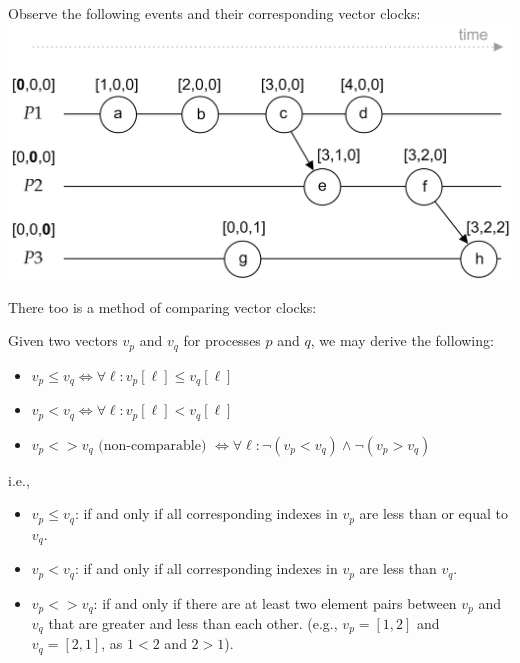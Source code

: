 \begin{Example}

    Observe the following events and their corresponding vector clocks:\\

    \hspace{4em}
    \includegraphics[width=.7\textwidth]{./Sections/time/vector.png}

    \vspace{1em}

\end{Example}

\newpage 

\noindent
There too is a method of comparing vector clocks:
\begin{theo}

    Given two vectors $v_p$ and $v_q$ for processes $p$ and $q$, we may derive the following:
    \begin{itemize}
        \item $v_p \leq v_q \Longleftrightarrow \forall \ell:  v_p[\ell] \leq v_q[\ell]$
        \item $v_p < v_q \Longleftrightarrow \forall \ell:  v_p[\ell] < v_q[\ell]$
        \item $v_p <> v_q \text{ (non-comparable) } \Longleftrightarrow \forall \ell:  \neg(v_p < v_q ) \land \neg(v_p > v_q)$
    \end{itemize}

    \noindent
    i.e.,
    \begin{itemize}
        \item $v_p \leq v_q$: if and only if all corresponding indexes in $v_p$ are less than or equal to $v_q$.
        \item $v_p < v_q$: if and only if all corresponding indexes in $v_p$ are less than $v_q$.
        \item $v_p <> v_q$: if and only if there are at least two element pairs between $v_p$ and $v_q$ that are greater and less than each other.
        (e.g., $v_p = [1,2]$ and $v_q = [2,1]$, as $1 < 2$ and $2 > 1$).
    \end{itemize}
\end{theo}

